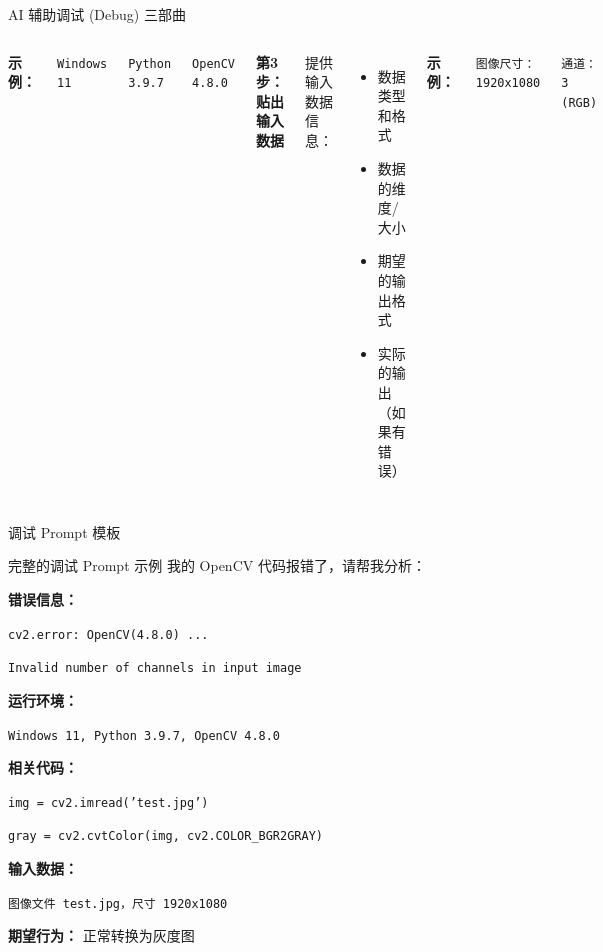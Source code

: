 \begin{frame}{AI 辅助调试 (Debug) 三部曲}
\begin{columns}
		\textbf{示例：}

		\texttt{Windows 11}

		\texttt{Python 3.9.7}

		\texttt{OpenCV 4.8.0}

		\textbf{第3步：贴出输入数据}

		提供输入数据信息：
		\begin{itemize}
			\item 数据类型和格式
			\item 数据的维度/大小
			\item 期望的输出格式
			\item 实际的输出（如果有错误）
		\end{itemize}

		\textbf{示例：}

		\texttt{图像尺寸：1920x1080}

		\texttt{通道：3 (RGB)}
	\end{columns}
\end{frame}

\begin{frame}{调试 Prompt 模板}
	\begin{exampleblock}{完整的调试 Prompt 示例}
		我的 OpenCV 代码报错了，请帮我分析：

		\vspace{0.2cm}

		\textbf{错误信息：}

		\texttt{cv2.error: OpenCV(4.8.0) ...}

		\texttt{Invalid number of channels in input image}

		\vspace{0.2cm}

		\textbf{运行环境：}

		\texttt{Windows 11, Python 3.9.7, OpenCV 4.8.0}

		\vspace{0.2cm}

		\textbf{相关代码：}

		\texttt{img = cv2.imread('test.jpg')}

		\texttt{gray = cv2.cvtColor(img, cv2.COLOR\_BGR2GRAY)}

		\vspace{0.2cm}

		\textbf{输入数据：}

		\texttt{图像文件 test.jpg，尺寸 1920x1080}

		\vspace{0.2cm}

		\textbf{期望行为：} 正常转换为灰度图
	\end{exampleblock}
\end{frame}

